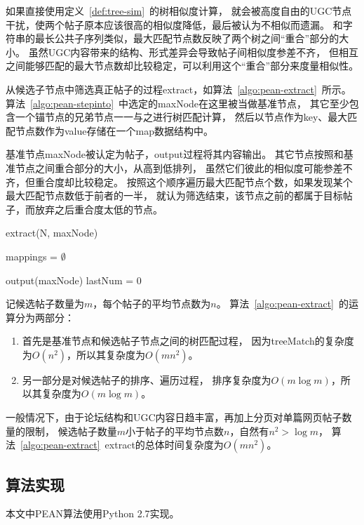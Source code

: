 如果直接使用定义~\ref{def:tree-sim}~的树相似度计算，
就会被高度自由的UGC节点干扰，使两个帖子原本应该很高的相似度降低，最后被认为不相似而遗漏。
和字符串的最长公共子序列类似，最大匹配节点数反映了两个树之间“重合”部分的大小。
虽然UGC内容带来的结构、形式差异会导致帖子间相似度参差不齐，
但相互之间能够匹配的最大节点数却比较稳定，可以利用这个“重合”部分来度量相似性。

从候选子节点中筛选真正帖子的过程extract，如算法~\ref{algo:pean-extract}~所示。
算法~\ref{algo:pean-stepinto}~中选定的maxNode在这里被当做基准节点，
其它至少包含一个锚节点的兄弟节点一一与之进行树匹配计算，
然后以节点作为key、最大匹配节点数作为value存储在一个map数据结构中。

基准节点maxNode被认定为帖子，output过程将其内容输出。
其它节点按照和基准节点之间重合部分的大小，从高到低排列，
虽然它们彼此的相似度可能参差不齐，但重合度却比较稳定。
按照这个顺序遍历最大匹配节点个数，如果发现某个最大匹配节点数低于前者的一半，
就认为筛选结束，该节点之前的都属于目标帖子，而放弃之后重合度太低的节点。

\begin{algorithm}[t]
\caption{extract(N, maxNode)}
\label{algo:pean-extract}

mappings = $\emptyset$ \;

output(maxNode) \;
lastNum = 0 \;
\end{algorithm}

记候选帖子数量为$m$，每个帖子的平均节点数为$n$。
算法~\ref{algo:pean-extract}~的运算分为两部分：
\begin{enumerate}
\item 首先是基准节点和候选帖子节点之间的树匹配过程，
因为treeMatch的复杂度为$O(n^2)$，所以其复杂度为$O(mn^2)$。
\item 另一部分是对候选帖子的排序、遍历过程，
排序复杂度为$O(m\log m)$，所以其复杂度为$O(m\log m)$。
\end{enumerate}

一般情况下，由于论坛结构和UGC内容日趋丰富，再加上分页对单篇网页帖子数量的限制，
候选帖子数量$m$小于帖子的平均节点数$n$，自然有$n^2 > \log m$，
算法~\ref{algo:pean-extract}~extract的总体时间复杂度为$O(mn^2)$。

\subsection{算法实现}
本文中PEAN算法使用Python 2.7实现。

